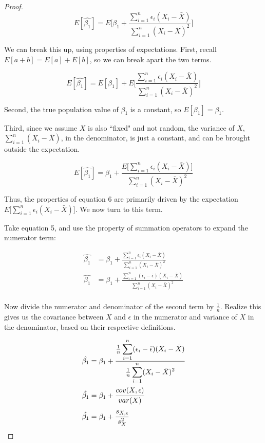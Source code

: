 \documentclass{article}
\begin{document}
\begin{proof}
\begin{equation*}
E[\hat{\beta_1}]=E\Bigg[\beta_1+\frac{\displaystyle \sum^n_{i=1} \epsilon_i(X_i-\bar{X})}{\displaystyle\sum^n_{i=1} (X_i-\bar{X})^2} \Bigg]	
\end{equation*}

We can break this up, using properties of expectations. First, recall $E[a+b]=E[a]+E[b]$, so we can break apart the two terms. 

\begin{equation*}
	E[\hat{\beta_1}]=E[\beta_1]+E\Bigg[\frac{\displaystyle \sum^n_{i=1} \epsilon_i(X_i-\bar{X})}{\displaystyle\sum^n_{i=1} (X_i-\bar{X})^2} \Bigg]	
\end{equation*}

Second, the true population value of $\beta_1$ is a constant, so $E[\beta_1]=\beta_1$.

Third, since we assume $X$ is also ``fixed" and not random, the variance of $X$, $\displaystyle\sum_{i=1}^n (X_i-\bar{X})$, in the denominator, is just a constant, and can be brought outside the expectation. 

\begin{equation}
	E[\hat{\beta_1}]=\beta_1+\frac{E\bigg[\displaystyle \sum^n_{i=1} \epsilon_i(X_i-\bar{X})\bigg]	}{\displaystyle\sum^n_{i=1} (X_i-\bar{X})^2} 
\end{equation}

Thus, the properties of equation 6 are primarily driven by the expectation $E\bigg[\displaystyle \sum^n_{i=1} \epsilon_i(X_i-\bar{X})\bigg]$. We now turn to this term. 

Take equation 5, and use the property of summation operators to expand the numerator term: 

\begin{align*}
	\hat{\beta_1}&=\beta_1+\frac{\displaystyle \sum^n_{i=1} \epsilon_i(X_i-\bar{X})}{\displaystyle\sum^n_{i=1} (X_i-\bar{X})^2} \\
		\hat{\beta_1}&=\beta_1+\frac{\displaystyle \sum^n_{i=1} (\epsilon_i-\bar{\epsilon})(X_i-\bar{X})}{\displaystyle\sum^n_{i=1} (X_i-\bar{X})^2} \\
\end{align*}


Now divide the numerator and denominator of the second term by $\frac{1}{n}$. Realize this gives us the covariance between $X$ and $\epsilon$ in the numerator and variance of $X$ in the denominator, based on their respective definitions.

\begin{align*}
	\hat{\beta_1}&=\beta_1+\cfrac{\frac{1}{n}\displaystyle \sum^n_{i=1} (\epsilon_i-\bar{\epsilon})(X_i-\bar{X})}{\frac{1}{n}\displaystyle\sum^n_{i=1} (X_i-\bar{X})^2} \\
	\hat{\beta_1}&=\beta_1+\cfrac{cov(X,\epsilon)}{var(X)} \\
	\hat{\beta_1}&=\beta_1+\cfrac{s_{X,\epsilon}}{s_X^2} \\
\end{align*}


\end{proof}
\end{document}
